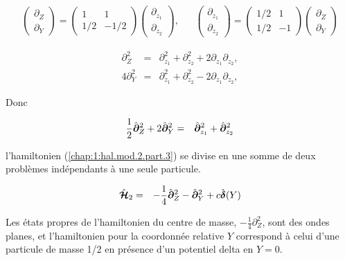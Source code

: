 {\begin{eqnarray*}
	\left ( \begin{array}{c} \partial_Z \\ \partial_Y \end{array} \right ) = \left ( \begin{array}{cc} 1 & 1  \\ 1/2 &  -1/2   \end{array} \right ) \left ( \begin{array}{c} \partial_{z_1} \\ \partial_{z_2} \end{array} \right ), & & \left ( \begin{array}{c} \partial_{z_1} \\ \partial_{z_2} \end{array} \right ) = \left ( \begin{array}{cc} 1/2 &  1  \\ 1/2 & - 1  \end{array} \right ) \left ( \begin{array}{c} \partial_Z \\ \partial_Y \end{array} \right )		
\end{eqnarray*}

\begin{eqnarray*}
	\partial_Z^2 & = & 	\partial_{z_1}^2 + \partial_{z_2}^2 + 2 \partial_{z_1} \partial_{z_2},\\
	4\partial_Y^2 & = & 	\partial_{z_1}^2 + \partial_{z_2}^2 - 2 \partial_{z_1} \partial_{z_2},
\end{eqnarray*}

Donc 


}

\begin{eqnarray*}
	\frac{1}{2} \hat{\bm{\partial}}_Z^2 + 	2\hat{\bm{\partial}}_Y^2 & = & \hat{\bm{\partial}}_{z_1}^2 + \hat{\bm{\partial}}_{z_2}^2
\end{eqnarray*}

l'hamiltonien (\ref{chap:1:hal.mod.2.part.3}) se divise en une somme de deux problèmes indépendants à une seule particule.

\begin{eqnarray}\label{chap:1:hal.mod.2.part.4}
	\hat{\bm{\mathcal{H}}}_2 & = & 	-\frac{1}{4} \hat{\bm{\partial}}_Z^2 - 	\hat{\bm{\partial}}_Y^2 + c \hat{\bm{\delta}} ( Y ) 
\end{eqnarray}

Les états propres de l'hamiltonien du centre de masse, $-\frac{1}{4} \partial_Z^2$, sont des ondes planes, et l'hamiltonien pour la coordonnée relative $Y$ correspond à celui d'une particule de masse 1/2 en présence d'un potentiel delta en $Y = 0$. 

